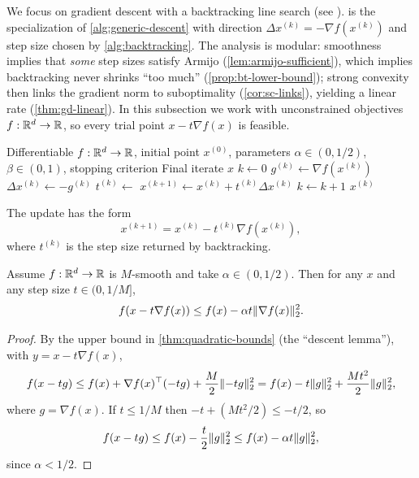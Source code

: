 We focus on gradient descent with a backtracking line search (see \citet[\S9.3]{boyd_vandenberghe_2004_convex}).
 is the specialization of \cref{alg:generic-descent} with direction $\Delta x^{(k)}=-\nabla f(x^{(k)})$ and step size chosen by \cref{alg:backtracking}.
The analysis is modular: smoothness implies that \emph{some} step sizes satisfy Armijo (\cref{lem:armijo-sufficient}), which implies backtracking never shrinks ``too much'' (\cref{prop:bt-lower-bound}); strong convexity then links the gradient norm to suboptimality (\cref{cor:sc-links}), yielding a linear rate (\cref{thm:gd-linear}).
In this subsection we work with unconstrained objectives $f:\mathbb{R}^d\to\mathbb{R}$, so every trial point $x-t\nabla f(x)$ is feasible.

\begin{algorithm}
  \caption{Gradient descent with backtracking line search}
  \label{alg:gd-backtracking}
  \begin{algorithmic}[1]
    \Require Differentiable $f:\mathbb{R}^d\to\mathbb{R}$, initial point $x^{(0)}$, parameters $\alpha \in (0,1/2)$, $\beta \in (0,1)$, stopping criterion
    \Ensure Final iterate $x$
    \State $k \gets 0$
      \State $g^{(k)} \gets \nabla f(x^{(k)})$
      \State $\Delta x^{(k)} \gets -g^{(k)}$
      \State $t^{(k)} \gets$  
      \State $x^{(k+1)} \gets x^{(k)} + t^{(k)}\Delta x^{(k)}$
      \State $k \gets k + 1$
    \EndWhile
    \State \Return $x^{(k)}$
  \end{algorithmic}
\end{algorithm}

The update has the form
\begin{equation}
  x^{(k+1)} = x^{(k)} - t^{(k)} \nabla f(x^{(k)}),
  \label{eq:gd-update}
\end{equation}
where $t^{(k)}$ is the step size returned by backtracking.

\begin{lemma}
\label{lem:armijo-sufficient}
Assume $f:\mathbb{R}^d\to\mathbb{R}$ is $M$-smooth and take $\alpha \in (0,1/2)$.
Then for any $x$ and any step size $t \in (0,1/M]$,
\begin{equation}
  f(x-t\nabla f(x)) \le f(x) - \alpha t \lVert\nabla f(x)\rVert_2^2.
  \label{eq:armijo-sufficient}
\end{equation}
\end{lemma}
\begin{proof}
By the upper bound in \cref{thm:quadratic-bounds} (the ``descent lemma''), with $y=x-t\nabla f(x)$,
\[
f(x-tg) \le f(x) + \nabla f(x)^\top(-tg) + \frac{M}{2}\lVert-tg\rVert_2^2
= f(x) - t\lVert g\rVert_2^2 + \frac{M t^2}{2}\lVert g\rVert_2^2,
\]
where $g=\nabla f(x)$.
If $t \le 1/M$ then $-t + (Mt^2/2) \le -t/2$, so
\[
f(x-tg) \le f(x) - \frac{t}{2}\lVert g\rVert_2^2 \le f(x) - \alpha t \lVert g\rVert_2^2,
\]
since $\alpha<1/2$.
\end{proof}

